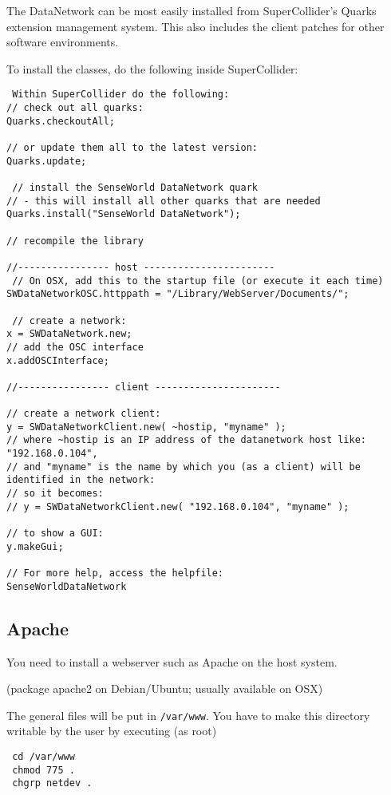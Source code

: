 \documentclass[letterpaper,10pt]{article}
\begin{document}
The DataNetwork can be most easily installed from SuperCollider's Quarks extension management system.
This also includes the client patches for other software environments.

To install the classes, do the following inside SuperCollider:

\begin{verbatim}
 Within SuperCollider do the following:
// check out all quarks:
Quarks.checkoutAll;

// or update them all to the latest version:
Quarks.update;

 // install the SenseWorld DataNetwork quark
// - this will install all other quarks that are needed
Quarks.install("SenseWorld DataNetwork");

// recompile the library 

//---------------- host -----------------------
 // On OSX, add this to the startup file (or execute it each time)
SWDataNetworkOSC.httppath = "/Library/WebServer/Documents/";

 // create a network:
x = SWDataNetwork.new;
// add the OSC interface
x.addOSCInterface;

//---------------- client ----------------------

// create a network client:
y = SWDataNetworkClient.new( ~hostip, "myname" );
// where ~hostip is an IP address of the datanetwork host like: "192.168.0.104",
// and "myname" is the name by which you (as a client) will be identified in the network:
// so it becomes:
// y = SWDataNetworkClient.new( "192.168.0.104", "myname" );

// to show a GUI:
y.makeGui;
 
// For more help, access the helpfile:
SenseWorldDataNetwork
\end{verbatim}


\subsection{Apache}

You need to install a webserver such as Apache on the host system.

(package apache2 on Debian/Ubuntu; usually available on OSX)

The general files will be put in \verb|/var/www|.
You have to make this directory writable by the user by executing (as root)

\begin{verbatim}
 cd /var/www
 chmod 775 .
 chgrp netdev .
\end{verbatim}
\end{document}
